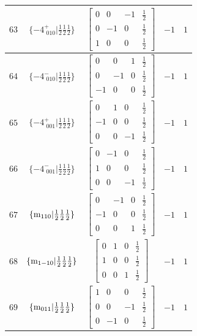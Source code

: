 \documentclass[fleqn,8pt]{jsarticle}
\begin{document}
\begin{longtable}{ccccc}
$ 63 $ & $ \{-4^{+}_{\,\,010}|\frac{1}{2} \frac{1}{2} \frac{1}{2}\} $ & $ \begin{bmatrix} 0 & 0 & -1 & \frac{1}{2} \\ 0 & -1 & 0 & \frac{1}{2} \\ 1 & 0 & 0 & \frac{1}{2} \end{bmatrix} $ & $ -1 $ & $ 1 $ \\ \hline
$ 64 $ & $ \{-4^{-}_{\,\,010}|\frac{1}{2} \frac{1}{2} \frac{1}{2}\} $ & $ \begin{bmatrix} 0 & 0 & 1 & \frac{1}{2} \\ 0 & -1 & 0 & \frac{1}{2} \\ -1 & 0 & 0 & \frac{1}{2} \end{bmatrix} $ & $ -1 $ & $ 1 $ \\ \hline
$ 65 $ & $ \{-4^{+}_{\,\,001}|\frac{1}{2} \frac{1}{2} \frac{1}{2}\} $ & $ \begin{bmatrix} 0 & 1 & 0 & \frac{1}{2} \\ -1 & 0 & 0 & \frac{1}{2} \\ 0 & 0 & -1 & \frac{1}{2} \end{bmatrix} $ & $ -1 $ & $ 1 $ \\ \hline
$ 66 $ & $ \{-4^{-}_{\,\,001}|\frac{1}{2} \frac{1}{2} \frac{1}{2}\} $ & $ \begin{bmatrix} 0 & -1 & 0 & \frac{1}{2} \\ 1 & 0 & 0 & \frac{1}{2} \\ 0 & 0 & -1 & \frac{1}{2} \end{bmatrix} $ & $ -1 $ & $ 1 $ \\ \hline
$ 67 $ & $ \{{\rm m}_{110}|\frac{1}{2} \frac{1}{2} \frac{1}{2}\} $ & $ \begin{bmatrix} 0 & -1 & 0 & \frac{1}{2} \\ -1 & 0 & 0 & \frac{1}{2} \\ 0 & 0 & 1 & \frac{1}{2} \end{bmatrix} $ & $ -1 $ & $ 1 $ \\ \hline
$ 68 $ & $ \{{\rm m}_{1-10}|\frac{1}{2} \frac{1}{2} \frac{1}{2}\} $ & $ \begin{bmatrix} 0 & 1 & 0 & \frac{1}{2} \\ 1 & 0 & 0 & \frac{1}{2} \\ 0 & 0 & 1 & \frac{1}{2} \end{bmatrix} $ & $ -1 $ & $ 1 $ \\ \hline
$ 69 $ & $ \{{\rm m}_{011}|\frac{1}{2} \frac{1}{2} \frac{1}{2}\} $ & $ \begin{bmatrix} 1 & 0 & 0 & \frac{1}{2} \\ 0 & 0 & -1 & \frac{1}{2} \\ 0 & -1 & 0 & \frac{1}{2} \end{bmatrix} $ & $ -1 $ & $ 1 $ \\ \hline

\end{longtable}
\end{document}
